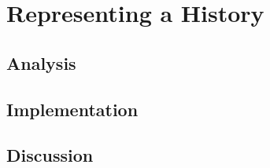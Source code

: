 \chapter{Representing a History}
\label{chap:representing-a-history}
	\section{Analysis} %
	\section{Implementation} %
	\section{Discussion} %